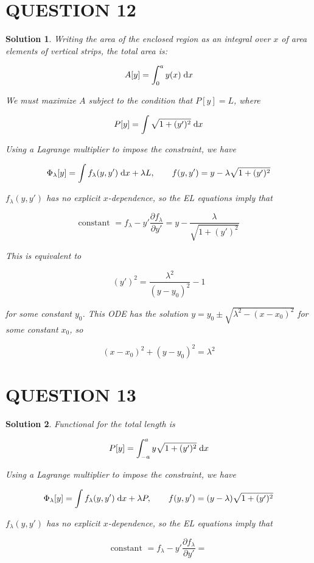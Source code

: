 \documentclass[a4paper]{article}
\newtheorem*{soln}{Solution}
\begin{document}
\section{QUESTION 12}
\begin{soln}
	
	Writing the area of the enclosed region as an integral over $ x $ of area elements of vertical strips, the total area is:
	
	\[ A[y] =  \int_{0}^{a} y(x) \; \mathrm{d} x \]
	
	We must maximize $ A $ subject to the condition that $ P[y] = L $, where 
	
	\[ P[y] = \int \sqrt{1 + (y')^{2}} \; \mathrm{d} x \]
	
	Using a Lagrange multiplier to impose the constraint, we have
	
	\[ \Phi_{\lambda}[y] = \int f_{\lambda} (y,y') \; \mathrm{d} x + \lambda L, \qquad f(y,y') = y - \lambda \sqrt{1 + (y')^{2}} \]
	
	$ f_{\lambda}(y,y') $ has no explicit $ x $-dependence, so the EL equations imply that
	
	\[ \text{constant } = f_{\lambda} - y' \frac{\partial f_{\lambda} }{\partial y'} = y - \frac{\lambda}{\sqrt{1 + (y')^{2}}}  \]
	
	This is equivalent to 
	
	\[ (y')^{2} = \frac{\lambda^{2}}{(y - y_{0})^{2}} - 1 \]
	
	for some constant $ y_{0} $. This ODE has the solution $ y = y_{0} \pm \sqrt{\lambda^{2} - (x - x_{0})^{2}} $ for some constant $ x_{0} $, so
	
	\[ (x - x_{0})^{2} + (y - y_{0})^{2} = \lambda^{2} \]
	
	
 	
\end{soln}

\section{QUESTION 13}


\begin{soln}
		Functional for the total length is 
		
		\[ P[y] = \int_{-a}^{a}  y\sqrt{1 + (y')^{2}} \; \mathrm{d} x \]
		
		Using a Lagrange multiplier to impose the constraint, we have
	
	\[ \Phi_{\lambda}[y] = \int f_{\lambda} (y,y') \; \mathrm{d} x + \lambda P, \qquad f(y,y') = (y- \lambda)\sqrt{1 + (y')^{2}} \]
	
		$ f_{\lambda}(y,y') $ has no explicit $ x $-dependence, so the EL equations imply that
	
	\[ \text{constant } = f_{\lambda} - y' \frac{\partial f_{\lambda} }{\partial y'} =  \]
	
	
	
	
\end{soln}
\end{document}
